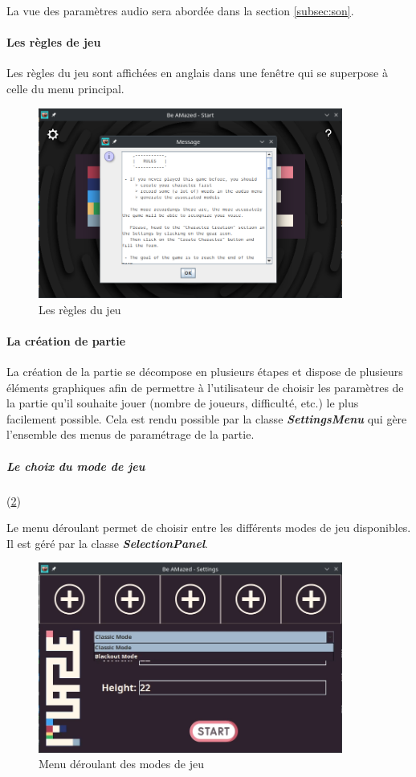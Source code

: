 La vue des paramètres audio sera abordée dans la section \ref{subsec:son}.

\paragraph{Les règles de jeu}

Les règles du jeu sont affichées en anglais dans une fenêtre qui se superpose à celle du menu principal.

\begin{figure}[h!]
    \centering
    \includegraphics[width=10cm]{ressources/Implementation/Labyrinthe/Controleur/Rules.png}%
    \caption{Les règles du jeu}
    \label{fig:Rules}
\end{figure}
\FloatBarrier

\paragraph{La création de partie}

La création de la partie se décompose en plusieurs étapes et dispose de plusieurs éléments graphiques afin de permettre à l'utilisateur de choisir les paramètres de la partie qu'il souhaite jouer (nombre de joueurs, difficulté, etc.) le plus facilement possible. Cela est rendu possible par la classe \textbf{\textit{SettingsMenu}} qui gère l'ensemble des menus de paramétrage de la partie.

\subparagraph*{Le choix du mode de jeu} (\ref{fig:ModeSelection})

Le menu déroulant permet de choisir entre les différents modes de jeu disponibles. Il est géré par la classe \textbf{\textit{SelectionPanel}}.

\begin{figure}[h!]
    \centering
    \includegraphics[width=10cm]{ressources/Implementation/Labyrinthe/Controleur/SettingsMenu_ModeList.png}%
    \caption{Menu déroulant des modes de jeu}
    \label{fig:ModeSelection}
\end{figure}
\FloatBarrier

